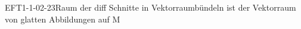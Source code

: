 
\begin{REM}{EFT1-1-02-23}{Raum der diff Schnitte in Vektorraumbündeln ist der Vektorraum von glatten Abbildungen auf M}
\end{REM}
